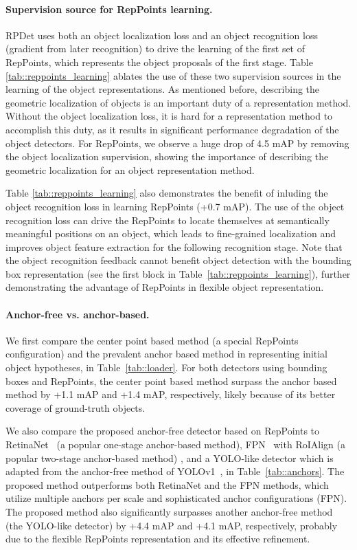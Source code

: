\documentclass[10pt,twocolumn,letterpaper]{article}
\begin{document}
 
\vspace{-5pt}
\paragraph{Supervision source for RepPoints learning.}
RPDet uses both an object localization loss and an object recognition loss (gradient from later recognition) to drive the learning of the first set of RepPoints, which represents the object proposals of the first stage. Table \ref{tab::reppoints_learning} ablates the use of these two supervision sources in the learning of the object representations. As mentioned before, describing the geometric localization of objects is an important duty of a representation method. Without the object localization loss, it is hard for a representation method to accomplish this duty, as it results in significant performance degradation of the object detectors. For RepPoints, we observe a huge drop of 4.5 mAP by removing the object localization supervision, showing the importance of describing the geometric localization for an object representation method.

Table \ref{tab::reppoints_learning} also demonstrates the benefit of inluding the object recognition loss in learning RepPoints (+0.7 mAP). The use of the object recognition loss can drive the RepPoints to locate themselves at semantically meaningful positions on an object, which leads to fine-grained localization and improves object feature extraction for the following recognition stage. Note that the object recognition feedback cannot benefit object detection with the bounding box representation (see the first block in Table~\ref{tab::reppoints_learning}), further demonstrating the advantage of RepPoints in flexible object representation.

\vspace{-5pt}
\paragraph{Anchor-free vs. anchor-based.}
We first compare the center point based method (a special RepPoints configuration) and the prevalent anchor based method in representing initial object hypotheses, in Table~\ref{tab::loader}. For both detectors using bounding boxes and RepPoints, the center point based method surpass the anchor based method by +1.1 mAP and +1.4 mAP, respectively, likely because of its better coverage of ground-truth objects.

We also compare the proposed anchor-free detector based on RepPoints to RetinaNet~\cite{RetinaNet} (a popular one-stage anchor-based method), FPN~\cite{FPN} with RoIAlign (a popular two-stage anchor-based method) \cite{Mask-rcnn}, and a YOLO-like detector which is adapted from the anchor-free method of YOLOv1~\cite{YOLO}, in Table~\ref{tab::anchors}. The proposed method outperforms both RetinaNet \cite{RetinaNet} and the FPN \cite{FPN} methods, which utilize multiple anchors per scale and sophisticated anchor configurations (FPN). The proposed method also significantly surpasses another anchor-free method (the YOLO-like detector) by +4.4 mAP and +4.1 mAP, respectively, probably due to the flexible RepPoints representation and its effective refinement.
\end{document}
